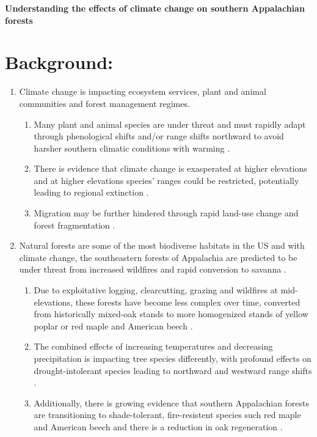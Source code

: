 \documentclass{article}\usepackage[]{graphicx}\usepackage[]{color}
\begin{document}
\noindent \textbf{\Large{Understanding the effects of climate change on southern Appalachian forests }}

\renewcommand{\thetable}{\arabic{table}}
\renewcommand{\thefigure}{\arabic{figure}}
\renewcommand{\labelitemi}{$-$}


\section*{Background:}
\begin{enumerate}
\item Climate change is impacting ecosystem services, plant and animal communities and forest management regimes. 
  \begin{enumerate}
  \item Many plant and animal species are under threat and must rapidly adapt through phenological shifts and/or range shifts northward to avoid harsher southern climatic conditions with warming \citep{Parmesan2003, Schwartz2006}.
  \item There is evidence that climate change is exasperated at higher elevations \citep{Giorgi1997,Rangwala2012,Pepin2015} and at higher elevations species' ranges could be restricted, potentially leading to regional extinction \citep{Bachelet2001, Potter2008}.
  \item Migration may be further hindered through rapid land-use change and forest fragmentation \citep{Opdam2004}.
  \end{enumerate}
  
\item Natural forests are some of the most biodiverse habitats in the US \citep{White1988} and with climate change, the southeastern forests of Appalachia are predicted to be under threat from increased wildfires and rapid conversion to savanna \citep{Bachelet2001}.
  \begin{enumerate} 
  \item Due to exploitative logging, clearcutting, grazing and wildfires at mid-elevations, these forests have become less complex over time, converted from historically mixed-oak stands to more homogenized stands of yellow poplar or red maple and American beech \citep{Lorimer1989, Rentch2003, Rentch2003b, Runkle1982}.
  \item The combined effects of increasing temperatures and decreasing precipitation is impacting tree species differently, with profound effects on drought-intolerant species leading to northward and westward range shifts \citep{Fei2017}.
  \item Additionally, there is growing evidence that southern Appalachian forests are transitioning to shade-tolerant, fire-resistent species such red maple and American beech \citep{Fei2017, Knott2019} and there is a reduction in oak regeneration \citep{Izbicki2020}.
  \end{enumerate}
  

\end{enumerate}
\end{document}
